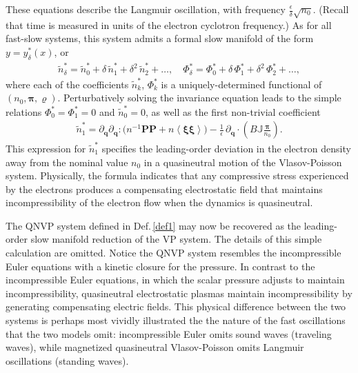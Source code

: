 \documentclass[%
 aip,
 amsmath,amssymb,
reprint, onecolumn %
]{revtex4-1}
\begin{document}
These equations describe the Langmuir oscillation, with frequency $ \frac{\epsilon}{\delta}\sqrt{n_0}$. (Recall that time is measured in units of the electron cyclotron frequency.) As for all fast-slow systems, this system admits a formal slow manifold of the form $y = y_\delta^*(x)$, or 
\begin{align*}
\widetilde{n}^*_\delta = \widetilde{n}^*_0 + \delta\,\widetilde{n}^*_1 + \delta^2\,\widetilde{n}^*_2 + \dots,\quad \Phi^*_\delta = \Phi^*_0 + \delta\,\Phi^*_1 + \delta^2\,\Phi^*_2 + \dots,
\end{align*}
where each of the coefficients $\widetilde{n}^*_k$, $\Phi^*_k$ is a uniquely-determined functional of $(n_0,\bm{\pi},\varrho)$. Perturbatively solving the invariance equation leads to the simple relations $\Phi^*_0 = \Phi^*_1 = 0$ and $\widetilde{n}^*_0 =  0$, as well as the first non-trivial coefficient
\begin{align}
\widetilde{n}^*_1 = \partial_{\bm{q}}\partial_{\bm{q}}:\bigg(n^{-1}\bm{P}\bm{P} + n\left\langle\bm{\xi}\bm{\xi}\right\rangle\bigg) - \frac{1}{\epsilon}\,\partial_{\bm{q}}\cdot\left(B\mathbb{J}\frac{\bm{\pi}}{n_0}\right).\label{qn_n1}
\end{align}
This expression for $\widetilde{n}^*_1$ specifies the leading-order deviation in the electron density away from the nominal value $n_0$ in a quasineutral motion of the Vlasov-Poisson system. Physically, the formula indicates that any compressive stress experienced by the electrons produces a compensating electrostatic field that maintains incompressibility of the electron flow when the dynamics is quasineutral.

The QNVP system defined in Def.\,\ref{def1} may now be recovered as the leading-order slow manifold reduction of the VP system. The details of this simple calculation are omitted. Notice the QNVP system resembles the incompressible Euler equations with a kinetic closure for the pressure. In contrast to the incompressible Euler equations, in which the scalar pressure adjusts to maintain incompressibility, quasineutral electrostatic plasmas maintain incompressibility by generating compensating electric fields. This physical difference between the two systems is perhaps most vividly illustrated the the nature of the fast oscillations that the two models omit: incompressible Euler omits sound waves (traveling waves), while magnetized quasineutral Vlasov-Poisson omits Langmuir oscillations (standing waves).
\end{document}
